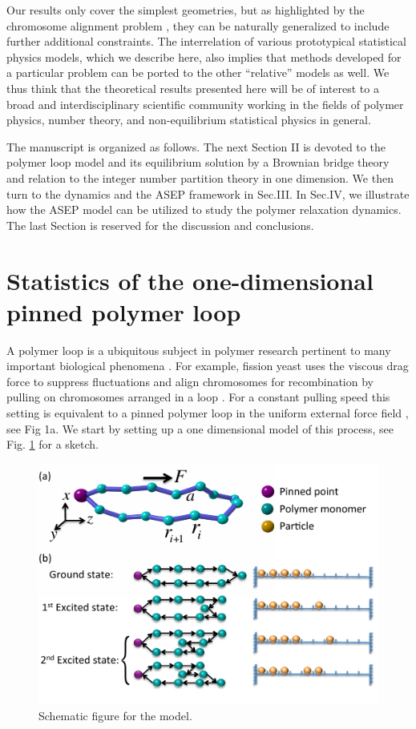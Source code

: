 \documentclass[aps,showpacs,twocolumn,floatfix,prx,superscriptaddress]{revtex4-1}
\begin{document}
Our results only cover the simplest geometries, but as highlighted by the chromosome alignment problem \cite{Ding2004,Vogel2009,Koszul2009a}, they can be naturally generalized to include further additional constraints. The interrelation of various prototypical statistical physics models, which we describe here, also implies that methods developed for a particular problem can be ported to the other ``relative'' models as well. We thus think that the theoretical results presented here will be of interest to a broad and interdisciplinary scientific community working in the fields of polymer physics, number theory, and non-equilibrium statistical physics in general. 

The manuscript is organized as follows. The next Section II is devoted to the polymer loop model and its equilibrium solution by a Brownian bridge theory and relation to the integer number partition theory in one dimension. We then turn to the dynamics and the ASEP framework in Sec.III. In Sec.IV, we illustrate how the ASEP model can be utilized to study the polymer relaxation dynamics. The last Section is reserved for the discussion and conclusions.

\section{Statistics of the one-dimensional pinned polymer loop}
A polymer loop is a ubiquitous subject in polymer research pertinent to many important biological phenomena \cite{Sachs1995,Lin2015,Halverson2014}. For example, fission yeast uses the viscous drag force to suppress fluctuations and align chromosomes for recombination by pulling on chromosomes arranged in a loop \cite{Lin2015}. For a constant pulling speed this setting is equivalent to a pinned polymer loop in the uniform external force field \cite{Lin2015}, see Fig 1a. We start by setting up a one dimensional model of this process, see Fig. \ref{fig:schematic} for a sketch. 
\begin{figure}[htpb]
    \centering
    \includegraphics[width=1.0\linewidth]{schematic}
    \caption{Schematic figure for the model.}
    \label{fig:schematic}
\end{figure}
\end{document}
